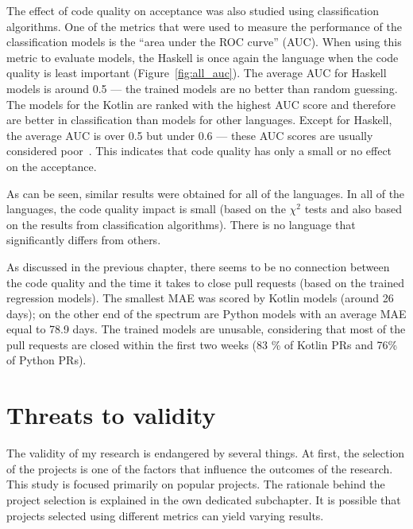 \documentclass[digital,oneside,oldtable,nolof,nolot,nocover]{fithesis4}
\begin{document}
The effect of code quality on acceptance was also studied using
classification algorithms.  One of the metrics that were used to measure the
performance of the classification models is the ``area under the ROC curve''
(AUC). When using this metric to evaluate models, the Haskell is once again
the language when the code quality is least important
(Figure~\ref{fig:all_auc}). The average AUC for Haskell models is around
0.5 --- the trained models are no better than random guessing.
The models for the Kotlin are ranked with the highest AUC score and therefore
are better in classification than models for other languages.
Except for Haskell, the average AUC is over 0.5 but under 0.6 --- these AUC
scores are usually considered poor~\cite{logreg}. This indicates that code quality
has only a small or no effect on the acceptance.

As can be seen, similar results were obtained for all of the languages.
In all of the languages, the code quality impact is small (based on the \(\chi^2\) tests
and also based on the results from classification algorithms). There is no language
that significantly differs from others.

As discussed in the previous chapter, there seems to be no connection between
the code quality and the time it takes to close pull requests (based on the
trained regression models).  The smallest MAE was scored by Kotlin models
(around 26 days); on the other end of the spectrum are Python models with an
average MAE equal to 78.9 days. The trained models are unusable, considering
that most of the pull requests are closed within the first two weeks (83 \% of Kotlin
PRs and 76\% of Python PRs).
\section{Threats to validity}
\label{sec:org0d7c650}
The validity of my research is endangered by several things.
At first, the selection of the projects is one of the factors that influence
the outcomes of the research. This study is focused primarily on popular
projects. The rationale behind the project selection is explained in the own dedicated
subchapter. It is possible that projects selected using different metrics can yield
varying results.
\end{document}

